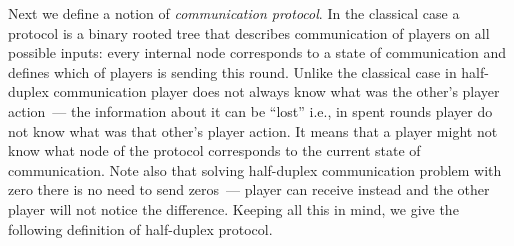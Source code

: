 Next we define a notion of \emph{communication protocol}. 
In the classical case a protocol is a binary rooted tree that describes communication of players on all possible inputs: every internal node corresponds to a state 
of communication and defines which of players is sending
this round. Unlike the classical case in half-duplex
communication player does not always know what was the
other's player action~--- the information about it can 
be ``lost'' i.e., in spent rounds player do not know 
what was that other's player action. 
It means that a player might not know what node of the protocol corresponds
to the current state of communication. 
Note also that solving half-duplex communication problem with zero 
there is no need to send zeros~--- player can receive instead and 
the other player will not notice the difference.
Keeping all this in mind, we give the following definition 
of half-duplex protocol.
